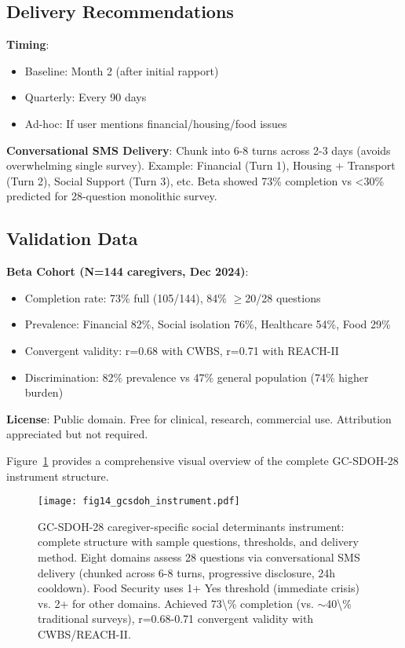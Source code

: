 \documentclass{article}
\begin{document}
\subsection*{Delivery Recommendations}

\textbf{Timing}:
\begin{itemize}
    \item Baseline: Month 2 (after initial rapport)
    \item Quarterly: Every 90 days
    \item Ad-hoc: If user mentions financial/housing/food issues
\end{itemize}

\textbf{Conversational SMS Delivery}: Chunk into 6-8 turns across 2-3 days (avoids overwhelming single survey). Example: Financial (Turn 1), Housing + Transport (Turn 2), Social Support (Turn 3), etc. Beta showed 73\% completion vs <30\% predicted for 28-question monolithic survey.

\subsection*{Validation Data}

\textbf{Beta Cohort (N=144 caregivers, Dec 2024)}:
\begin{itemize}
    \item Completion rate: 73\% full (105/144), 84\% $\geq$20/28 questions
    \item Prevalence: Financial 82\%, Social isolation 76\%, Healthcare 54\%, Food 29\%
    \item Convergent validity: r=0.68 with CWBS, r=0.71 with REACH-II
    \item Discrimination: 82\% prevalence vs 47\% general population (74\% higher burden)
\end{itemize}

\textbf{License}: Public domain. Free for clinical, research, commercial use. Attribution appreciated but not required.

Figure~\ref{fig:gcsdoh_visual} provides a comprehensive visual overview of the complete GC-SDOH-28 instrument structure.

%
\begin{figure}[htbp]%
\centering%
\texttt{[image: fig14\_gcsdoh\_instrument.pdf]}%
\caption{GC-SDOH-28 caregiver-specific social determinants instrument: complete structure with sample questions, thresholds, and delivery method. Eight domains assess 28 questions via conversational SMS delivery (chunked across 6-8 turns, progressive disclosure, 24h cooldown). Food Security uses 1+ Yes threshold (immediate crisis) vs. 2+ for other domains. Achieved 73\textbackslash{}\% completion (vs. $\sim$40\textbackslash{}\% traditional surveys), r=0.68-0.71 convergent validity with CWBS/REACH-II.}%
\label{fig:gcsdoh_visual}%
\end{figure}%
\end{document}

